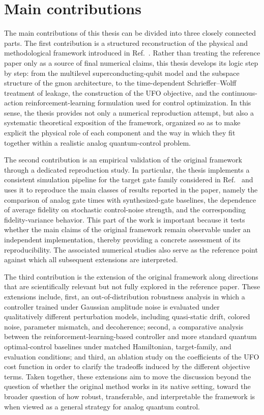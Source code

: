 \section{Main contributions}
\label{subsec:intro_main_contributions}

The main contributions of this thesis can be divided into three closely connected parts. The first contribution is a structured reconstruction of the physical and methodological framework introduced in Ref.~\cite{Niu2019}. Rather than treating the reference paper only as a source of final numerical claims, this thesis develops its logic step by step: from the multilevel superconducting-qubit model and the subspace structure of the gmon architecture, to the time-dependent Schrieffer--Wolff treatment of leakage, the construction of the UFO objective, and the continuous-action reinforcement-learning formulation used for control optimization. In this sense, the thesis provides not only a numerical reproduction attempt, but also a systematic theoretical exposition of the framework, organized so as to make explicit the physical role of each component and the way in which they fit together within a realistic analog quantum-control problem.

The second contribution is an empirical validation of the original framework through a dedicated reproduction study. In particular, the thesis implements a consistent simulation pipeline for the target gate family considered in Ref.~\cite{Niu2019} and uses it to reproduce the main classes of results reported in the paper, namely the comparison of analog gate times with synthesized-gate baselines, the dependence of average fidelity on stochastic control-noise strength, and the corresponding fidelity-variance behavior. This part of the work is important because it tests whether the main claims of the original framework remain observable under an independent implementation, thereby providing a concrete assessment of its reproducibility. The associated numerical studies also serve as the reference point against which all subsequent extensions are interpreted.

The third contribution is the extension of the original framework along directions that are scientifically relevant but not fully explored in the reference paper. These extensions include, first, an out-of-distribution robustness analysis in which a controller trained under Gaussian amplitude noise is evaluated under qualitatively different perturbation models, including quasi-static drift, colored noise, parameter mismatch, and decoherence; second, a comparative analysis between the reinforcement-learning-based controller and more standard quantum optimal-control baselines under matched Hamiltonian, target-family, and evaluation conditions; and third, an ablation study on the coefficients of the UFO cost function in order to clarify the tradeoffs induced by the different objective terms. Taken together, these extensions aim to move the discussion beyond the question of whether the original method works in its native setting, toward the broader question of how robust, transferable, and interpretable the framework is when viewed as a general strategy for analog quantum control.

